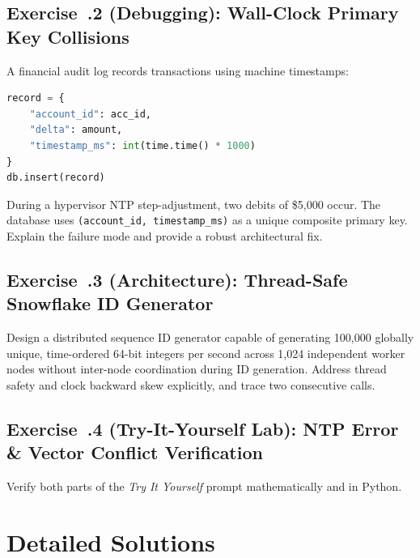\subsection*{Exercise~\thechapter.2 (Debugging): Wall-Clock Primary Key Collisions}
A financial audit log records transactions using machine timestamps:
\begin{lstlisting}[language=Python]
record = {
    "account_id": acc_id,
    "delta": amount,
    "timestamp_ms": int(time.time() * 1000)
}
db.insert(record)
\end{lstlisting}
During a hypervisor NTP step-adjustment, two debits of \$5,000 occur. The database uses \texttt{(account\_id, timestamp\_ms)} as a unique composite primary key. Explain the failure mode and provide a robust architectural fix.

\subsection*{Exercise~\thechapter.3 (Architecture): Thread-Safe Snowflake ID Generator}
Design a distributed sequence ID generator capable of generating 100,000 globally unique, time-ordered 64-bit integers per second across 1,024 independent worker nodes without inter-node coordination during ID generation. Address thread safety and clock backward skew explicitly, and trace two consecutive calls.

\subsection*{Exercise~\thechapter.4 (Try-It-Yourself Lab): NTP Error \& Vector Conflict Verification}
Verify both parts of the \emph{Try It Yourself} prompt mathematically and in Python.

\section{Detailed Solutions}

